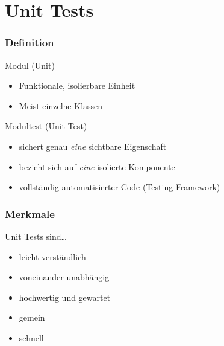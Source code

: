 \section{Unit Tests}

\begin{frame}
  \frametitle{Definition}
  \begin{block}{Modul (Unit)}
    \begin{itemize}
      \item Funktionale, isolierbare Einheit
      \item Meist einzelne Klassen
    \end{itemize}
  \end{block}

  \begin{block}{Modultest (Unit Test)}
    \begin{itemize}
      \item sichert genau \emph{eine} sichtbare Eigenschaft
      \item bezieht sich auf \emph{eine} isolierte Komponente
      \item vollständig automatisierter Code (Testing Framework)
    \end{itemize}
  \end{block}
\end{frame}

\begin{frame}
  \frametitle{Merkmale}

  \begin{block}{Unit Tests sind\ldots}
    \begin{itemize}
      \item leicht verständlich
      \item voneinander unabhängig
      \item hochwertig und gewartet
      \item \glqq{}gemein\grqq{}
      \item schnell
    \end{itemize}
  \end{block}
\end{frame}

